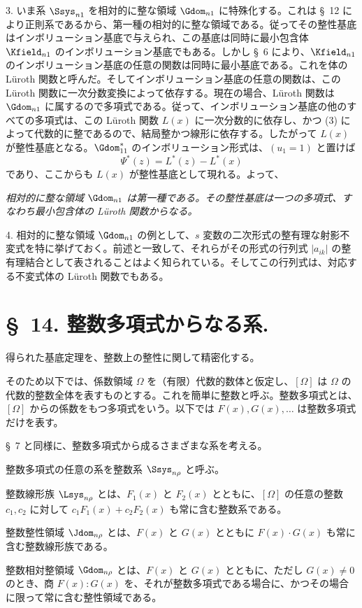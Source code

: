 \documentclass[11pt]{article}
\begin{document}
3. いま系 $\Ssys_{n1}$ を相対的に整な領域 $\Gdom_{n1}$ に特殊化する。これは \S\ 12 により正則系であるから、第一種の相対的に整な領域である。従ってその整性基底はインボリューション基底で与えられ、この基底は同時に最小包含体 $\Kfield_{n1}$ のインボリューション基底でもある。しかし \S\ 6 により、$\Kfield_{n1}$ のインボリューション基底の任意の関数は同時に最小基底である。これを体の Lüroth 関数と呼んだ。そしてインボリューション基底の任意の関数は、この Lüroth 関数に一次分数変換によって依存する。現在の場合、Lüroth 関数は $\Gdom_{n1}$ に属するので多項式である。従って、インボリューション基底の他のすべての多項式は、この Lüroth 関数 $L(x)$ に一次分数的に依存し、かつ (3) によって代数的に整であるので、結局整かつ線形に依存する。したがって $L(x)$ が整性基底となる。$\Gdom^*_{11}$ のインボリューション形式は、$(u_1=1)$ と置けば
\[
  \Psi^*(z)=L^*(z)-L^*(x)
\]
であり、ここからも $L(x)$ が整性基底として現れる。よって、

\emph{相対的に整な領域 $\Gdom_{n1}$ は第一種である。その整性基底は一つの多項式、すなわち最小包含体の Lüroth 関数からなる。}

4. 相対的に整な領域 $\Gdom_{n1}$ の例として、$s$ 変数の二次形式の整有理な射影不変式を特に挙げておく。前述と一致して、それらがその形式の行列式 $|a_{ik}|$ の整有理結合として表されることはよく知られている。そしてこの行列式は、対応する不変式体の Lüroth 関数でもある。

\section*{\S\ 14. 整数多項式からなる系.}

得られた基底定理を、整数上の整性に関して精密化する。

そのため以下では、係数領域 $\Omega$ を（有限）代数的数体と仮定し、$[\Omega]$ は $\Omega$ の代数的整数全体を表すものとする。これを簡単に整数と呼ぶ。整数多項式とは、$[\Omega]$ からの係数をもつ多項式をいう。以下では $F(x),G(x),\ldots$ は整数多項式だけを表す。

\S\ 7 と同様に、整数多項式から成るさまざまな系を考える。

整数多項式の任意の系を整数系 $\Ssys_{n\rho}$ と呼ぶ。

整数線形族 $\Lsys_{n\rho}$ とは、$F_1(x)$ と $F_2(x)$ とともに、$[\Omega]$ の任意の整数 $c_1,c_2$ に対して $c_1F_1(x)+c_2F_2(x)$ も常に含む整数系である。

整数整性領域 $\Jdom_{n\rho}$ とは、$F(x)$ と $G(x)$ とともに $F(x)\cdot G(x)$ も常に含む整数線形族である。

整数相対整領域 $\Gdom_{n\rho}$ とは、$F(x)$ と $G(x)$ とともに、ただし $G(x)\ne0$ のとき、商 $F(x):G(x)$ を、それが整数多項式である場合に、かつその場合に限って常に含む整性領域である。
\end{document}
